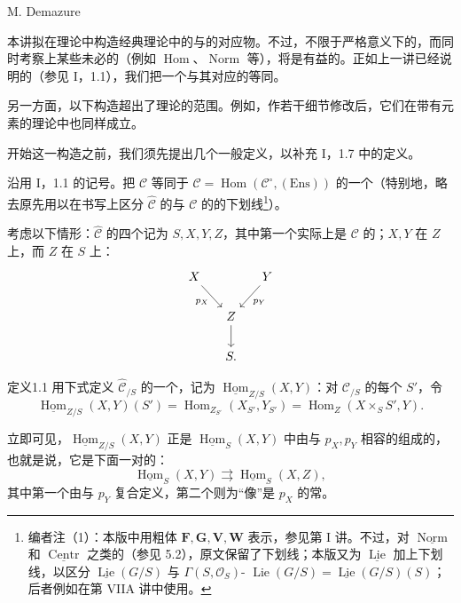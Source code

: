 \begin{center}M. Demazure\end{center}
本讲拟在理论中构造经典理论中的与的对应物。不过，不限于严格意义下的，而同时考察上某些未必的（例如 $\operatorname{Hom}$、$\operatorname{Norm}$ 等），将是有益的。正如上一讲已经说明的（参见 I，1.1），我们把一个与其对应的等同。

另一方面，以下构造超出了理论的范围。例如，作若干细节修改后，它们在带有元素的理论中也同样成立。

开始这一构造之前，我们须先提出几个一般定义，以补充 I，1.7 中的定义。

沿用 I，1.1 的记号。把 $\mathscr C$ 等同于 $\widehat{\mathscr C}=\operatorname{Hom}(\mathscr C^\circ,(\mathrm{Ens}))$ 的一个（特别地，略去原先用以在书写上区分 $\widehat{\mathscr C}$ 的与 $\mathscr C$ 的的下划线\footnote{编者注（1）：本版中用粗体 $\mathbf F,\mathbf G,\mathbf V,\mathbf W$ 表示，参见第 I 讲。不过，对 $\underline{\operatorname{Norm}}$ 和 $\underline{\operatorname{Centr}}$ 之类的（参见 5.2），原文保留了下划线；本版又为 $\underline{\operatorname{Lie}}$ 加上下划线，以区分 $\underline{\operatorname{Lie}}(G/S)$ 与 $\Gamma(S,\mathcal O_S)$- $\operatorname{Lie}(G/S)=\underline{\operatorname{Lie}}(G/S)(S)$；后者例如在第 VIIA 讲中使用。}）。

考虑以下情形：$\widehat{\mathscr C}$ 的四个记为 $S,X,Y,Z$，其中第一个实际上是 $\mathscr C$ 的；$X,Y$ 在 $Z$ 上，而 $Z$ 在 $S$ 上：
\[
\begin{tikzcd}[column sep=small]
X\arrow[dr,"p_X"']&&Y\arrow[dl,"p_Y"]\\
&Z\arrow[d]&\\
&S.&
\end{tikzcd}
\]
\begin{SGAresult}{定义}{1.1}
用下式定义 $\widehat{\mathscr C}_{/S}$ 的一个，记为 $\underline{\operatorname{Hom}}_{Z/S}(X,Y)$：对 $\mathscr C_{/S}$ 的每个 $S'$，令
\[
\underline{\operatorname{Hom}}_{Z/S}(X,Y)(S')
=\operatorname{Hom}_{Z_{S'}}(X_{S'},Y_{S'})
=\operatorname{Hom}_Z(X\times_S S',Y).\tag{1}
\]
\end{SGAresult}
立即可见，$\underline{\operatorname{Hom}}_{Z/S}(X,Y)$ 正是 $\underline{\operatorname{Hom}}_S(X,Y)$ 中由与 $p_X,p_Y$ 相容的组成的，也就是说，它是下面一对的：
\[
\underline{\operatorname{Hom}}_S(X,Y)\rightrightarrows
\underline{\operatorname{Hom}}_S(X,Z),
\]
其中第一个由与 $p_Y$ 复合定义，第二个则为“像”是 $p_X$ 的常。

